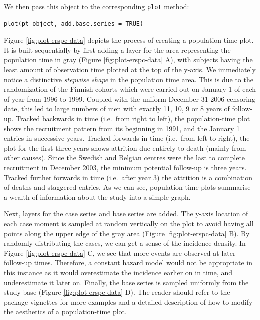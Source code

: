 We then pass this object to the corresponding \texttt{plot} method:

\begin{verbatim}
plot(pt_object, add.base.series = TRUE)
\end{verbatim}

Figure \ref{fig:plot-erspc-data} depicts the process of creating a population-time plot. It is built sequentially by first adding a layer for the area representing the population time in gray (Figure \ref{fig:plot-erspc-data} A), with subjects having the least amount of observation time plotted at the top of the y-axis. We immediately notice a distinctive \emph{stepwise shape} in the population time area. This is due to the randomization of the Finnish cohorts which were carried out on January 1 of each of year from 1996 to 1999. Coupled with the uniform December 31 2006 censoring date, this led to large numbers of men with exactly 11, 10, 9 or 8 years of follow-up. Tracked backwards in time (i.e.~from right to left), the population-time plot shows the recruitment pattern from its beginning in 1991, and the January 1 entries in successive years. Tracked forwards in time (i.e.~from left to right), the plot for the first three years shows attrition due entirely to death (mainly from other causes). Since the Swedish and Belgian centres were the last to complete recruitment in December 2003, the minimum potential follow-up is three years. Tracked further forwards in time (i.e.~after year 3) the attrition is a combination of deaths and staggered entries. As we can see, population-time plots summarise a wealth of information about the study into a simple graph.

Next, layers for the case series and base series are added. The y-axis location of each case moment is sampled at random vertically on the plot to avoid having all points along the upper edge of the gray area (Figure \ref{fig:plot-erspc-data} B). By randomly distributing the cases, we can get a sense of the incidence density. In Figure \ref{fig:plot-erspc-data} C, we see that more events are observed at later follow-up times. Therefore, a constant hazard model would not be appropriate in this instance as it would overestimate the incidence earlier on in time, and underestimate it later on. Finally, the base series is sampled uniformly from the study base (Figure \ref{fig:plot-erspc-data} D). The reader should refer to the package vignettes for more examples and a detailed description of how to modify the aesthetics of a population-time plot.

